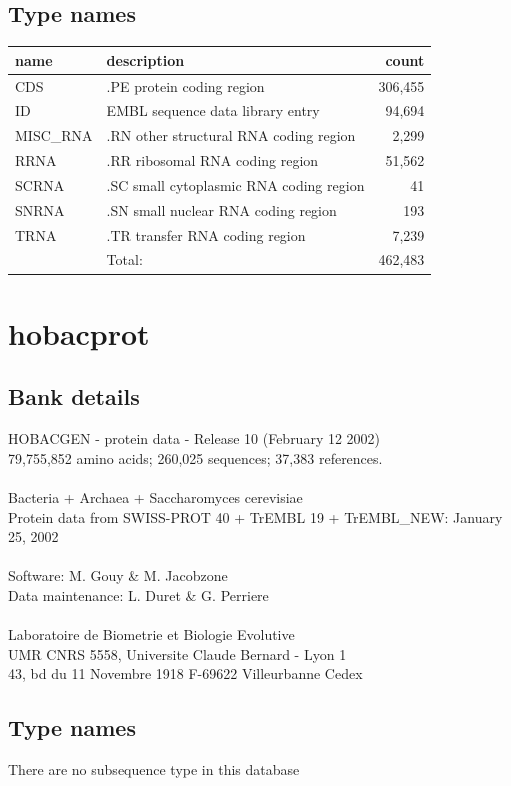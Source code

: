 \documentclass{article}
\begin{document}
\begin{Schunk}
\subsection{Type names}
\noindent\begin{tabular}{llr}
\hline \hline
name & description & count \\
\hline
CDS  &  .PE protein coding region  &  306,455 \\
ID  &  EMBL sequence data library entry  &  94,694 \\
MISC\_RNA  &  .RN other structural RNA coding region  &  2,299 \\
RRNA  &  .RR ribosomal RNA coding region  &  51,562 \\
SCRNA  &  .SC small cytoplasmic RNA coding region  &  41 \\
SNRNA  &  .SN small nuclear RNA coding region  &  193 \\
TRNA  &  .TR transfer RNA coding region  &  7,239 \\
\hline
 & Total: & 462,483 \\
\hline \hline
\end{tabular}

\section{ hobacprot }
\subsection{Bank details}
HOBACGEN - protein data - Release 10 (February 12 2002)\\
79,755,852 amino acids; 260,025 sequences; 37,383 references.\\
\\
Bacteria + Archaea + Saccharomyces cerevisiae\\
Protein data from SWISS-PROT 40 + TrEMBL 19 + TrEMBL\_NEW: January 25, 2002\\
\\
Software: M. Gouy \& M. Jacobzone\\
Data maintenance: L. Duret \& G. Perriere\\
\\
Laboratoire de Biometrie et Biologie Evolutive\\
UMR CNRS 5558, Universite Claude Bernard - Lyon 1\\
43, bd du 11 Novembre 1918 F-69622 Villeurbanne Cedex\\


\subsection{Type names}
There are no subsequence type in this database

\end{Schunk}
\end{document}
